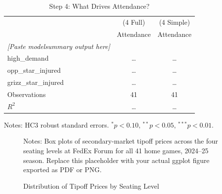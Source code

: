 \documentclass[12pt]{article}
\begin{document}
\begin{table}[H]
\centering
\caption{Step 4: What Drives Attendance?}
\label{tab:step4}
\small
\begin{tabular}{lcc}
\toprule
 & (4 Full) & (4 Simple) \\
 & Attendance & Attendance \\
\midrule
\textit{[Paste modelsummary output here]} & & \\
high\_demand         & \ldots & \ldots \\
opp\_star\_injured   & \ldots & \ldots \\
grizz\_star\_injured & \ldots & \ldots \\
\midrule
Observations & 41 & 41 \\
$R^2$ & \ldots & \ldots \\
\bottomrule
\end{tabular}
\begin{flushleft}
\footnotesize Notes: HC3 robust standard errors. $^{*}p<0.10$, $^{**}p<0.05$, $^{***}p<0.01$.
\end{flushleft}
\end{table}
 
\begin{figure}[H]
\centering
\caption{Distribution of Tipoff Prices by Seating Level}
\label{fig:pricedist}
\begin{flushleft}
\footnotesize Notes: Box plots of secondary-market tipoff prices across the four seating levels at FedEx Forum for all 41 home games, 2024--25 season. Replace this placeholder with your actual ggplot figure exported as PDF or PNG.
\end{flushleft}
\end{figure}
 
\end{document}
